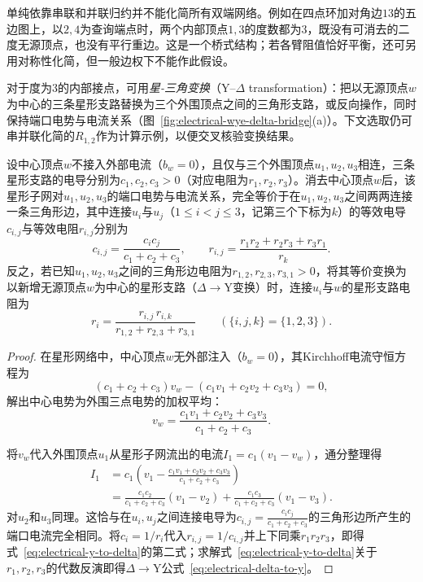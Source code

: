 单纯依靠串联和并联归约并不能化简所有双端网络。例如在四点环加对角边$13$的五边图上，以$2,4$为查询端点时，两个内部顶点$1,3$的度数都为$3$，既没有可消去的二度无源顶点，也没有平行重边。这是一个桥式结构；若各臂阻值恰好平衡，还可另用对称性化简，但一般边权下不能作此假设。

对于度为$3$的内部接点，可用\emph{星-三角变换}（$\text{Y--}\Delta$ transformation）：把以无源顶点$w$为中心的三条星形支路替换为三个外围顶点之间的三角形支路，或反向操作，同时保持端口电势与电流关系（图~\ref{fig:electrical-wye-delta-bridge}(a)）。下文选取仍可串并联化简的$R_{1,2}$作为计算示例，以便交叉核验变换结果。

\begin{theorem}
\label{thm:electrical-wye-delta}
设中心顶点$w$不接入外部电流（$b_w=0$），且仅与三个外围顶点$u_1,u_2,u_3$相连，三条星形支路的电导分别为$c_1,c_2,c_3>0$（对应电阻为$r_1,r_2,r_3$）。消去中心顶点$w$后，该星形子网对$u_1,u_2,u_3$的端口电势与电流关系，完全等价于在$u_1,u_2,u_3$之间两两连接一条三角形边，其中连接$u_i$与$u_j$（$1\leq i<j\leq 3$，记第三个下标为$k$）的等效电导$c_{i,j}$与等效电阻$r_{i,j}$分别为
\begin{equation}
  c_{i,j} = \frac{c_i c_j}{c_1 + c_2 + c_3}, \qquad
  r_{i,j} = \frac{r_1 r_2 + r_2 r_3 + r_3 r_1}{r_k}.
  \label{eq:electrical-y-to-delta}
\end{equation}
反之，若已知$u_1,u_2,u_3$之间的三角形边电阻为$r_{1,2},r_{2,3},r_{3,1}>0$，将其等价变换为以新增无源顶点$w$为中心的星形支路（$\Delta\to\text{Y}$变换）时，连接$u_i$与$w$的星形支路电阻为
\begin{equation}
  r_i = \frac{r_{i,j}\,r_{i,k}}{r_{1,2} + r_{2,3} + r_{3,1}} \qquad (\{i,j,k\}=\{1,2,3\}).
  \label{eq:electrical-delta-to-y}
\end{equation}
\end{theorem}

\begin{proof}
在星形网络中，中心顶点$w$无外部注入（$b_w=0$），其Kirchhoff电流守恒方程为
\[
  (c_1 + c_2 + c_3)v_w - (c_1 v_1 + c_2 v_2 + c_3 v_3) = 0,
\]
解出中心电势为外围三点电势的加权平均：
\[
  v_w = \frac{c_1 v_1 + c_2 v_2 + c_3 v_3}{c_1 + c_2 + c_3}.
\]

将$v_w$代入外围顶点$u_1$从星形子网流出的电流$I_1 = c_1(v_1 - v_w)$，通分整理得
\[
  \begin{aligned}
    I_1
    &= c_1\left(v_1 - \frac{c_1 v_1 + c_2 v_2 + c_3 v_3}{c_1 + c_2 + c_3}\right)\\
    &= \frac{c_1 c_2}{c_1 + c_2 + c_3}(v_1 - v_2) + \frac{c_1 c_3}{c_1 + c_2 + c_3}(v_1 - v_3).
  \end{aligned}
\]
对$u_2$和$u_3$同理。这恰与在$u_i,u_j$之间连接电导为$c_{i,j} = \frac{c_i c_j}{c_1+c_2+c_3}$的三角形边所产生的端口电流完全相同。将$c_i = 1/r_i$代入$r_{i,j}=1/c_{i,j}$并上下同乘$r_1 r_2 r_3$，即得式~\eqref{eq:electrical-y-to-delta}的第二式；求解式~\eqref{eq:electrical-y-to-delta}关于$r_1,r_2,r_3$的代数反演即得$\Delta\to\text{Y}$公式~\eqref{eq:electrical-delta-to-y}。
\end{proof}

